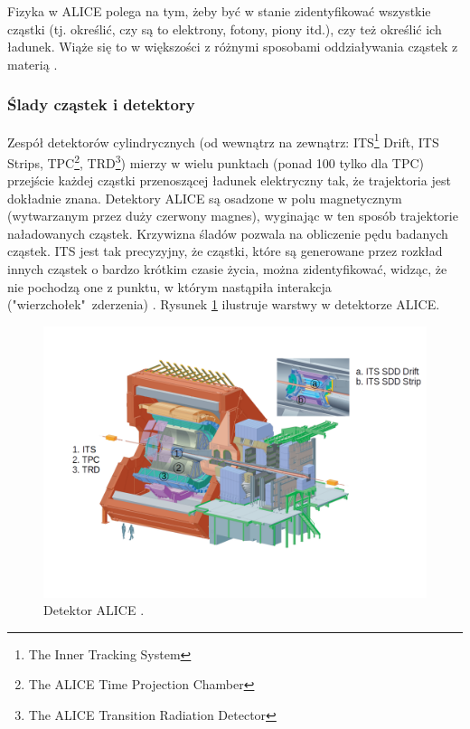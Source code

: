  Fizyka w ALICE polega na tym, żeby być w stanie zidentyfikować wszystkie cząstki (tj. określić, czy są to elektrony, fotony, piony itd.), czy też określić ich ładunek. Wiąże się to w większości z różnymi sposobami oddziaływania cząstek z materią \cite{aliceexperiment}.


\subsubsection{Ślady cząstek i detektory}

Zespół detektorów cylindrycznych (od wewnątrz na zewnątrz: ITS\footnote{The Inner Tracking System} Drift, ITS Strips, TPC\footnote{The ALICE Time Projection Chamber}, TRD\footnote{The ALICE Transition Radiation Detector}) mierzy w wielu punktach (ponad 100 tylko dla TPC) przejście każdej cząstki przenoszącej ładunek elektryczny tak, że trajektoria jest dokładnie znana. Detektory ALICE są osadzone w polu magnetycznym (wytwarzanym przez duży czerwony magnes), wyginając w ten sposób trajektorie naładowanych cząstek. Krzywizna śladów pozwala na obliczenie pędu badanych cząstek. ITS jest tak precyzyjny, że cząstki, które są generowane przez rozkład innych cząstek o bardzo krótkim czasie życia, można zidentyfikować, widząc, że nie pochodzą one z punktu, w którym nastąpiła interakcja ("wierzchołek"\ zderzenia) \cite{trackingparticles}. Rysunek \ref{rys9} ilustruje warstwy w detektorze ALICE.

\begin{figure}[H]
		\centering
 		\includegraphics[width=16.0cm]{detector.png}
    	\caption{Detektor ALICE \cite{aliceofficial}.}
 		\label{rys9}
\end{figure}
